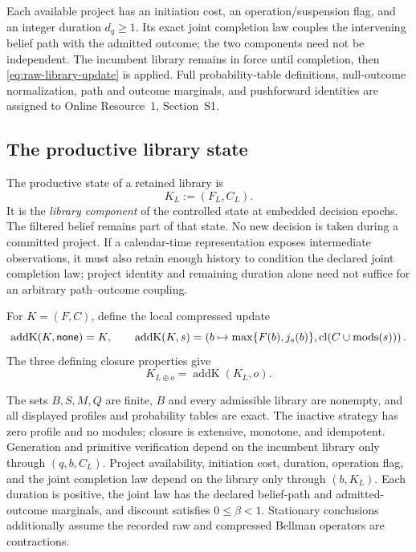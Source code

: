 Each available project has an initiation cost, an operation/suspension flag,
and an integer duration \(d_q\geq1\).  Its exact joint completion law couples
the intervening belief path with the admitted outcome; the two components need
not be independent.  The incumbent library remains in force until completion,
then \eqref{eq:raw-library-update} is applied.  Full probability-table
definitions, null-outcome normalization, path and outcome marginals, and
pushforward identities are assigned to Online Resource~1, Section~S1.

\subsection{The productive library state}

\begin{definition}
\label{def:finite-library-state}
The productive state of a retained library is
\begin{equation}
  K_L:=(F_L,C_L).
  \label{eq:closure-compression}
\end{equation}
It is the \emph{library component} of the controlled state at embedded
decision epochs. The filtered belief remains part of that state. No new
decision is taken during a committed project. If a calendar-time representation
exposes intermediate observations, it must also retain enough history to
condition the declared joint completion law; project identity and remaining
duration alone need not suffice for an arbitrary path--outcome coupling.
\end{definition}

For \(K=(F,C)\), define the local compressed update
\[
 \operatorname{addK}(K,\mathsf{none})=K,
 \qquad
 \operatorname{addK}(K,s)=
 \left(b\mapsto\max\{F(b),j_s(b)\},
       \operatorname{cl}(C\cup\operatorname{mods}(s))\right).
\]
The three defining closure properties give
\begin{equation}
  K_{L\oplus o}=\operatorname{addK}(K_L,o).
  \label{eq:raw-compressed-local-update}
\end{equation}

\begin{assumption}
\label{asm:aor-projection-process}
The sets \(B,S,M,Q\) are finite, \(B\) and every admissible library are
nonempty, and all displayed profiles and probability tables are exact.  The
inactive strategy has zero profile and no modules; closure is extensive,
monotone, and idempotent.  Generation and primitive verification depend on the
incumbent library only through \((q,b,C_L)\).  Project availability, initiation
cost, duration, operation flag, and the joint completion law depend on the
library only through \((b,K_L)\).  Each duration is positive, the joint law has
the declared belief-path and admitted-outcome marginals, and discount satisfies
\(0\leq\beta<1\).  Stationary conclusions additionally assume the recorded
raw and compressed Bellman operators are contractions.
\end{assumption}

